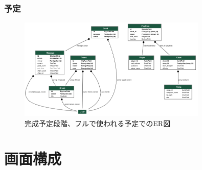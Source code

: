 \documentclass[a4j]{jarticle}
\begin{document}
\subsubsection{予定}
\begin{figure}[htbp]
  \centering
  \includegraphics[width=0.8\textwidth,bb=0 0 800 600]{img/myer_goal.png}
  \caption{完成予定段階、フルで使われる予定でのER図}
\end{figure}
\clearpage
\section{画面構成}
\end{document}
